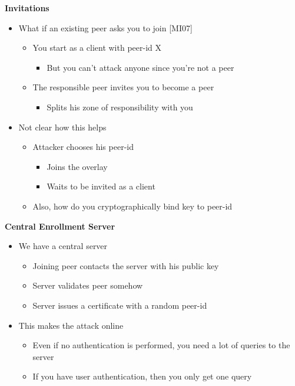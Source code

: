 \documentclass[helvetica]{seminar}
\newcommand{\heading}[1]{%
  \begin{center} 
    \large\bf 
    #1 
  \end{center} 
  \vspace{.4 in}}
\begin{document}
\begin{slide}
\heading{Invitations}

\begin{itemize}
\item What if an existing peer asks you to join [MI07]
\begin{itemize}
\item You start as a client with peer-id X
\begin{itemize}
\item But you can't attack anyone since you're not a peer
\end{itemize}
\item The responsible peer invites you to become a peer
\begin{itemize}
\item Splits his zone of responsibility with you
\end{itemize}
\end{itemize}
\item Not clear how this helps
\begin{itemize}
\item Attacker chooses his peer-id
\begin{itemize}
\item Joins the overlay
\item Waits to be invited as a client
\end{itemize}
\item Also, how do you cryptographically bind key to peer-id
\end{itemize}
\end{itemize}

\end{slide}



\begin{slide}
\heading{Central Enrollment Server}

\begin{itemize}
\item We have a central server
\begin{itemize}
\item Joining peer contacts the server with his public key
\item Server validates peer somehow
\item Server issues a certificate with a random peer-id
\end{itemize}
\item This makes the attack online
\begin{itemize}
\item Even if no authentication is performed, you need a lot of queries to the server
\item If you have user authentication, then you only get one query
\end{itemize}
\end{itemize}

\end{slide}
\end{document}
